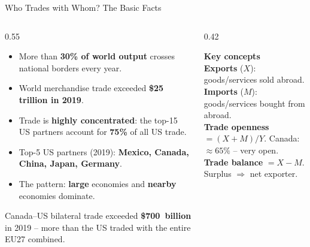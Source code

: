 \documentclass[aspectratio=169]{beamer}
\begin{document}
\begin{frame}[shrink=6]{Who Trades with Whom? The Basic Facts}
\begin{columns}[T]
\begin{column}{0.55\textwidth}
\begin{itemize}
  \item More than \textbf{30\% of world output} crosses national borders every year.
  \item World merchandise trade exceeded \textbf{\$25 trillion in 2019}.
  \item Trade is \textbf{highly concentrated}: the top-15 US partners account for \textbf{75\%} of all US trade.
  \item Top-5 US partners (2019): \textbf{Mexico, Canada, China, Japan, Germany}.
  \item The pattern: \textbf{large} economies and \textbf{nearby} economies dominate.
\end{itemize}
\vspace{0.3em}
\begin{canadex}
\footnotesize Canada–US bilateral trade exceeded \textbf{\$700~billion} in 2019 -- more than the US traded with the entire EU27 combined.
\end{canadex}
\end{column}
\begin{column}{0.42\textwidth}
\begin{varbox}
\footnotesize\textbf{Key concepts}\\[0.3em]
\textbf{Exports} ($X$): goods/services sold abroad.\\[0.3em]
\textbf{Imports} ($M$): goods/services bought from abroad.\\[0.3em]
\textbf{Trade openness} $= (X+M)/Y$.
Canada: $\approx65\%$ -- very open.\\[0.3em]
\textbf{Trade balance} $= X - M$.
Surplus $\Rightarrow$ net exporter.
\end{varbox}
\end{column}
\end{columns}
\end{frame}
\end{document}
